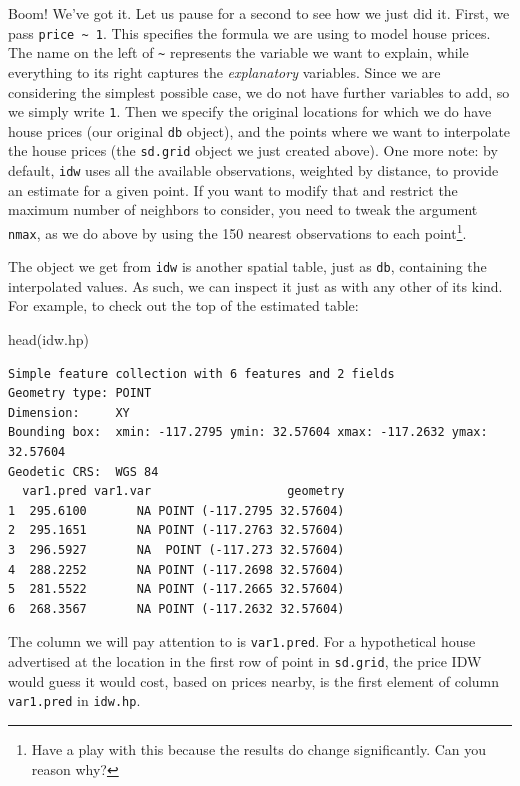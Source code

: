 \documentclass[
  letterpaper,
  DIV=11,
  numbers=noendperiod,
  oneside]{scrreprt}
\newenvironment{Shaded}{\begin{snugshade}}{\end{snugshade}}
\newcommand{\FunctionTok}[1]{\textcolor[rgb]{0.28,0.35,0.67}{#1}}
\newcommand{\NormalTok}[1]{\textcolor[rgb]{0.00,0.23,0.31}{#1}}
\begin{document}
Boom! We've got it. Let us pause for a second to see how we just did it.
First, we pass \texttt{price\ \textasciitilde{}\ 1}. This specifies the
formula we are using to model house prices. The name on the left of
\texttt{\textasciitilde{}} represents the variable we want to explain,
while everything to its right captures the \emph{explanatory} variables.
Since we are considering the simplest possible case, we do not have
further variables to add, so we simply write \texttt{1}. Then we specify
the original locations for which we do have house prices (our original
\texttt{db} object), and the points where we want to interpolate the
house prices (the \texttt{sd.grid} object we just created above). One
more note: by default, \texttt{idw} uses all the available observations,
weighted by distance, to provide an estimate for a given point. If you
want to modify that and restrict the maximum number of neighbors to
consider, you need to tweak the argument \texttt{nmax}, as we do above
by using the 150 nearest observations to each point\footnote{Have a play
  with this because the results do change significantly. Can you reason
  why?}.

The object we get from \texttt{idw} is another spatial table, just as
\texttt{db}, containing the interpolated values. As such, we can inspect
it just as with any other of its kind. For example, to check out the top
of the estimated table:

\begin{Shaded}
\begin{Highlighting}[]
\FunctionTok{head}\NormalTok{(idw.hp)}
\end{Highlighting}
\end{Shaded}

\begin{verbatim}
Simple feature collection with 6 features and 2 fields
Geometry type: POINT
Dimension:     XY
Bounding box:  xmin: -117.2795 ymin: 32.57604 xmax: -117.2632 ymax: 32.57604
Geodetic CRS:  WGS 84
  var1.pred var1.var                   geometry
1  295.6100       NA POINT (-117.2795 32.57604)
2  295.1651       NA POINT (-117.2763 32.57604)
3  296.5927       NA  POINT (-117.273 32.57604)
4  288.2252       NA POINT (-117.2698 32.57604)
5  281.5522       NA POINT (-117.2665 32.57604)
6  268.3567       NA POINT (-117.2632 32.57604)
\end{verbatim}

The column we will pay attention to is \texttt{var1.pred}. For a
hypothetical house advertised at the location in the first row of point
in \texttt{sd.grid}, the price IDW would guess it would cost, based on
prices nearby, is the first element of column \texttt{var1.pred} in
\texttt{idw.hp}.
\end{document}
